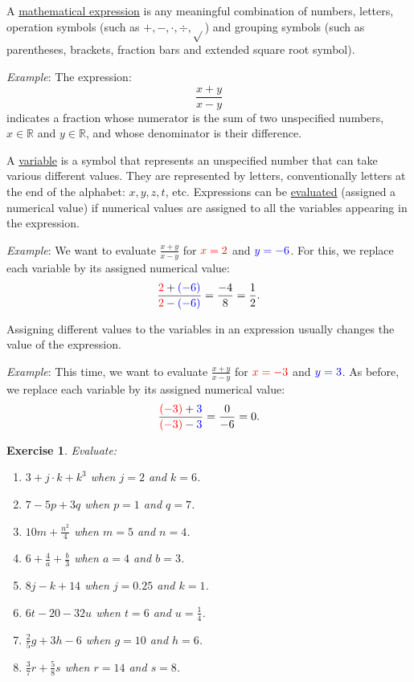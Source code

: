 \documentclass[12pt]{article}
\newtheorem{ex}{Exercise}[section]
\begin{document}
A \underline{mathematical expression} is any meaningful combination of numbers, letters, operation symbols (such as $+,-,\cdot,\div,\sqrt{}$) and grouping symbols (such as parentheses, brackets, fraction bars and extended square root symbol). 

\textit{Example}: The expression: 
$$\frac{x+y}{x-y}$$
indicates a fraction whose numerator is the sum of two unspecified numbers, $x\in \mathbb{R}$ and $y\in \mathbb{R}$, and whose denominator is their difference. 

A \underline{variable} is a symbol that represents an unspecified number that can take various different values. They are represented by letters, conventionally letters at the end of the alphabet: $x,y,z, t$, etc. Expressions can be \underline{evaluated} (assigned a numerical value) if numerical values are assigned to all the variables appearing in the expression.

\textit{Example}: We want to evaluate $\frac{x+y}{x-y}$ for $\textcolor{red}{x=2}$ and $\textcolor{blue}{y=-6}$. For this, we replace each variable by its assigned numerical value:
$$\frac{\textcolor{red}{2}+\textcolor{blue}{(-6)}}{\textcolor{red}{2}-\textcolor{blue}{(-6)}}=\frac{-4}{8}=\frac{1}{2}.$$

Assigning different values to the variables in an expression usually changes the value of the expression.

\textit{Example}: This time, we want to evaluate $\frac{x+y}{x-y}$ for $\textcolor{red}{x=-3}$ and $\textcolor{blue}{y=3}$. As before, we replace each variable by its assigned numerical value:
$$\frac{\textcolor{red}{(-3)}+\textcolor{blue}{3}}{\textcolor{red}{(-3)}-\textcolor{blue}{3}}=\frac{0}{-6}=0.$$

\begin{ex}\label{Ex1}
Evaluate:
\begin{multicols}{2}
\begin{enumerate}
\item[a)] $3+j\cdot k+k^{3}$ when $j=2$ and $k=6$.
\item[b)] $7-5p+3q$ when $p=1$ and $q=7$.
\item[c)] $10m+\frac{n^{2}}{4}$ when $m=5$ and $n=4$.
\item[d)] $6+\frac{4}{a}+\frac{b}{3}$ when $a=4$ and $b=3$.
\item[e)] $8j-k+14$ when $j=0.25$ and $k=1$.
\item[f)] $6t-20-32u$ when $t=6$ and $u=\frac{1}{4}$.
\item[g)] $\frac{2}{5}g+3h-6$ when $g=10$ and $h=6$.
\item[h)] $\frac{3}{7}r+\frac{5}{8}s$ when $r=14$ and $s=8$.
\end{enumerate}
\end{multicols}
\end{ex}
\end{document}
